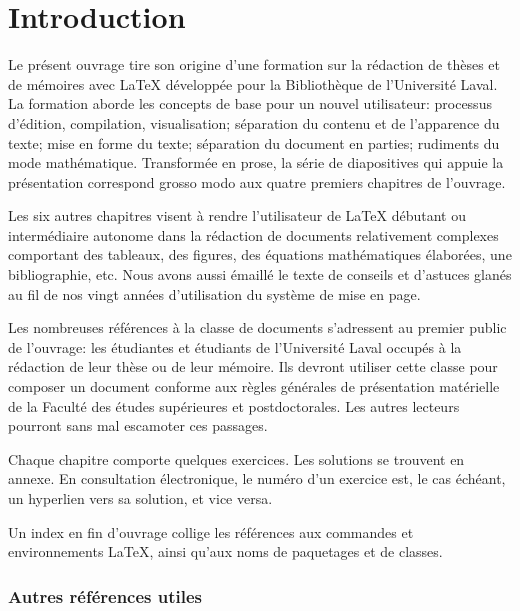 \chapter{Introduction}
\label{chap:introduction}

Le présent ouvrage tire son origine d'une formation sur la rédaction
de thèses et de mémoires avec {\LaTeX} développée pour la Bibliothèque
de l'Université Laval. La formation aborde les concepts de base pour
un nouvel utilisateur: processus d'édition, compilation,
visualisation; séparation du contenu et de l'apparence du texte; mise
en forme du texte; séparation du document en parties; rudiments du
mode mathématique. Transformée en prose, la série de diapositives qui
appuie la présentation correspond grosso modo aux quatre premiers
chapitres de l'ouvrage.

Les six autres chapitres visent à rendre l'utilisateur de {\LaTeX}
débutant ou intermédiaire autonome dans la rédaction de documents
relativement complexes comportant des tableaux, des figures, des
équations mathématiques élaborées, une bibliographie, etc. Nous avons
aussi émaillé le texte de conseils et d'astuces glanés au fil de nos
vingt années d'utilisation du système de mise en page.

Les nombreuses références à la classe de documents 
s'adressent au premier public de l'ouvrage: les étudiantes et
étudiants de l'Université Laval occupés à la rédaction de leur thèse
ou de leur mémoire. Ils devront utiliser cette classe pour composer un
document conforme aux règles générales de présentation matérielle de
la Faculté des études supérieures et postdoctorales. Les autres
lecteurs pourront sans mal escamoter ces passages.

Chaque chapitre comporte quelques exercices. Les solutions se trouvent
en annexe. En consultation électronique, le numéro d'un exercice est,
le cas échéant, un hyperlien vers sa solution, et vice versa.

Un index en fin d'ouvrage collige les références aux commandes et
environnements {\LaTeX}, ainsi qu'aux noms de paquetages et de
classes.

\subsection*{Autres références utiles}

